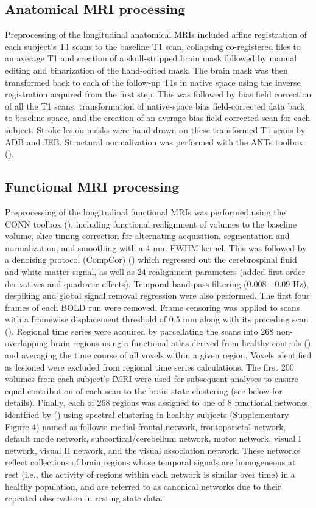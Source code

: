 \documentclass[phd,tocprelim]{cornell}
\begin{document}
	\subsection*{Anatomical MRI processing}
	Preprocessing of the longitudinal anatomical MRIs included affine registration of each subject’s T1 scans to the baseline T1 scan, collapsing co-registered files to an average T1 and creation of a skull-stripped brain mask followed by manual editing and binarization of the hand-edited mask. The brain mask was then transformed back to each of the follow-up T1s in native space using the inverse registration acquired from the first step. This was followed by bias field correction of all the T1 scans, transformation of native-space bias field-corrected data back to baseline space, and the creation of an average bias field-corrected scan for each subject. Stroke lesion masks were hand-drawn on these transformed T1 scans by ADB and JEB. Structural normalization was performed with the ANTs toolbox (\cite{Avants2011-bl}).
	
	\subsection*{Functional MRI processing}
	Preprocessing of the longitudinal functional MRIs was performed using the CONN toolbox (\cite{Whitfield-Gabrieli2012-ox}), including functional realignment of volumes to the baseline volume, slice timing correction for alternating acquisition, segmentation and normalization, and smoothing with a 4 mm FWHM kernel. This was followed by a denoising protocol (CompCor) (\cite{Behzadi2007-zt}) which regressed out the cerebrospinal fluid and white matter signal, as well as 24 realignment parameters (added first-order derivatives and quadratic effects). Temporal band-pass filtering (0.008 - 0.09 Hz), despiking and global signal removal regression were also performed. The first four frames of each BOLD run were removed. Frame censoring was applied to scans with a framewise displacement threshold of 0.5 mm along with its preceding scan (\cite{Power2012-zm}). Regional time series were acquired by parcellating the scans into 268 non-overlapping brain regions using a functional atlas derived from healthy controls (\cite{Shen2013-zn}) and averaging the time course of all voxels within a given region. Voxels identified as lesioned were excluded from regional time series calculations. The first 200 volumes from each subject's fMRI were used for subsequent analyses to ensure equal contribution of each scan to the brain state clustering (see below for details). Finally, each of 268 regions was assigned to one of 8 functional networks, identified by (\cite{Finn2015-er}) using spectral clustering in healthy subjects (Supplementary Figure 4) named as follows: medial frontal network, frontoparietal network, default mode network, subcortical/cerebellum network, motor network, visual I network, visual II network, and the visual association network. These networks reflect collections of brain regions whose temporal signals are homogeneous at rest (i.e., the activity of regions within each network is similar over time) in a healthy population, and are referred to as canonical networks due to their repeated observation in resting-state data.
	
\end{document}
